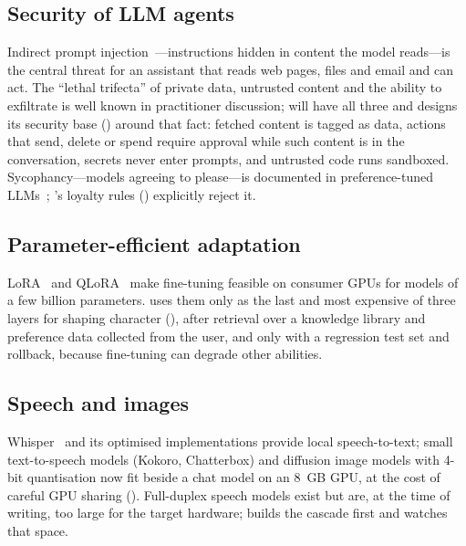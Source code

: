 \subsection{Security of LLM agents}
Indirect prompt injection~\cite{greshake2023}---instructions hidden in content the model reads---is the central threat for an assistant that reads web pages, files and email and can act. The ``lethal trifecta'' of private data, untrusted content and the ability to exfiltrate is well known in practitioner discussion; \hivi{} will have all three and designs its security base () around that fact: fetched content is tagged as data, actions that send, delete or spend require approval while such content is in the conversation, secrets never enter prompts, and untrusted code runs sandboxed. Sycophancy---models agreeing to please---is documented in preference-tuned LLMs~\cite{sharma2024}; \hivi{}'s loyalty rules () explicitly reject it.

\subsection{Parameter-efficient adaptation}
LoRA~\cite{lora} and QLoRA~\cite{qlora} make fine-tuning feasible on consumer GPUs for models of a few billion parameters. \hivi{} uses them only as the last and most expensive of three layers for shaping character (), after retrieval over a knowledge library and preference data collected from the user, and only with a regression test set and rollback, because fine-tuning can degrade other abilities.

\subsection{Speech and images}
Whisper~\cite{whisper} and its optimised implementations provide local speech-to-text; small text-to-speech models (Kokoro, Chatterbox) and diffusion image models with 4-bit quantisation now fit beside a chat model on an 8~GB GPU, at the cost of careful GPU sharing (). Full-duplex speech models exist but are, at the time of writing, too large for the target hardware; \hivi{} builds the cascade first and watches that space.
